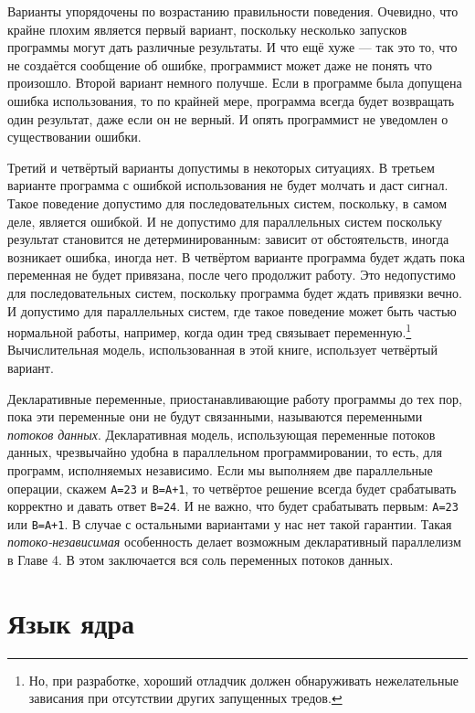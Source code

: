 Варианты упорядочены по возрастанию правильности поведения. Очевидно, что крайне плохим является первый вариант, поскольку несколько запусков программы могут дать различные результаты. И что ещё хуже --- так это то, что не создаётся сообщение об ошибке, программист может даже не понять что произошло. Второй вариант немного получше. Если в программе была допущена ошибка использования, то по крайней мере, программа всегда будет возвращать один результат, даже если он не верный. И опять программист не уведомлен о существовании ошибки.

Третий и четвёртый варианты допустимы в некоторых ситуациях. В третьем варианте программа с ошибкой использования не будет молчать и даст сигнал. Такое поведение допустимо для последовательных систем, поскольку, в самом деле, является ошибкой. И не допустимо для параллельных систем поскольку результат становится не детерминированным: зависит от обстоятельств, иногда возникает ошибка, иногда нет. В четвёртом варианте программа будет ждать пока переменная не будет привязана, после чего продолжит работу. Это недопустимо для последовательных систем, поскольку программа будет ждать привязки вечно. И допустимо для параллельных систем, где такое поведение может быть частью нормальной работы, например, когда один тред связывает переменную.\footnote{Но, при разработке, хороший отладчик должен обнаруживать нежелательные зависания при отсутствии других запущенных тредов.} Вычислительная модель, использованная в этой книге, использует четвёртый вариант.

Декларативные переменные, приостанавливающие работу программы до тех пор, пока эти переменные они не будут связанными, называются переменными \emph{потоков данных}. Декларативная модель, использующая переменные потоков данных, чрезвычайно удобна в параллельном программировании, то есть, для программ, исполняемых независимо. Если мы выполняем две параллельные операции, скажем \lstinline|A=23| и \lstinline|B=A+1|, то четвёртое решение всегда будет срабатывать корректно и давать ответ \lstinline|B=24|. И не важно, что будет срабатывать первым: \lstinline|A=23| или \lstinline|B=A+1|. В случае с остальными вариантами у нас нет такой гарантии. Такая \emph{потоко-независимая} особенность делает возможным декларативный параллелизм в Главе 4. В этом заключается вся соль переменных потоков данных.

\section{Язык ядра}\label{section:kernel_language}

